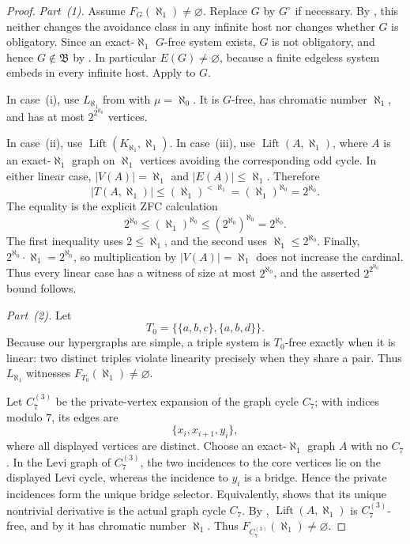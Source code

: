 \documentclass[11pt]{amsart}
\theoremstyle{definition}
\theoremstyle{remark}
\numberwithin{equation}{section}
\newcommand{\Bclass}{\mathfrak B}
\newcommand{\Lift}{\operatorname{Lift}}
\begin{document}
\begin{proof}
\emph{Part~\textup{(1)}.}
Assume $F_G(\aleph_1)\ne\varnothing$.  Replace $G$ by $G^\circ$ if
necessary.  By , this neither changes the
avoidance class in any infinite host nor changes whether $G$ is
obligatory.  Since an exact-$\aleph_1$ $G$-free system exists, $G$ is not
obligatory, and hence $G\notin\Bclass$ by .
In particular $E(G)\ne\varnothing$, because a finite edgeless system
embeds in every infinite host.  Apply
 to $G$.

In case~\textup{(i)}, use $L_{\aleph_1}$ from
 with $\mu=\aleph_0$.  It is $G$-free, has
chromatic number $\aleph_1$, and has at most
$2^{2^{\aleph_0}}$ vertices.

In case~\textup{(ii)}, use $\Lift(K_{\aleph_1},\aleph_1)$.  In
case~\textup{(iii)}, use $\Lift(A,\aleph_1)$, where $A$ is an
exact-$\aleph_1$ graph on $\aleph_1$ vertices avoiding the corresponding
odd cycle.  In either linear case, $|V(A)|=\aleph_1$ and
$|E(A)|\le\aleph_1$.  Therefore
\[
 |T(A,\aleph_1)|
 \le (\aleph_1)^{<\aleph_1}
 = (\aleph_1)^{\aleph_0}
 = 2^{\aleph_0}.
\]
The equality is the explicit ZFC calculation
\[
 2^{\aleph_0}
 \le (\aleph_1)^{\aleph_0}
 \le (2^{\aleph_0})^{\aleph_0}
 =2^{\aleph_0}.
\]
The first inequality uses $2\le\aleph_1$, and the second uses
$\aleph_1\le2^{\aleph_0}$.  Finally,
$2^{\aleph_0}\cdot\aleph_1=2^{\aleph_0}$, so multiplication by
$|V(A)|=\aleph_1$ does not increase the cardinal.  Thus every linear
case has a witness of size at most $2^{\aleph_0}$, and the asserted
$2^{2^{\aleph_0}}$ bound follows.

\emph{Part~\textup{(2)}.}
Let
\[
 T_0=\bigl\{\{a,b,c\},\{a,b,d\}\bigr\}.
\]
Because our hypergraphs are simple, a triple system is $T_0$-free
exactly when it is linear: two distinct triples violate linearity
precisely when they share a pair.
Thus $L_{\aleph_1}$ witnesses $F_{T_0}(\aleph_1)\ne\varnothing$.

Let $C_7^{(3)}$ be the private-vertex expansion of the graph cycle
$C_7$; with indices modulo $7$, its edges are
\[
 \{x_i,x_{i+1},y_i\},
\]
where all displayed vertices are distinct.  Choose an exact-$\aleph_1$
graph $A$ with no $C_7$.  In the Levi graph of $C_7^{(3)}$, the two incidences to the core
vertices lie on the displayed Levi cycle, whereas the incidence to
$y_i$ is a bridge.  Hence the private incidences form the unique bridge
selector.  Equivalently,  shows that its unique
nontrivial derivative is the actual graph cycle $C_7$.  By
, $\Lift(A,\aleph_1)$ is
$C_7^{(3)}$-free, and by  it has chromatic
number $\aleph_1$.  Thus $F_{C_7^{(3)}}(\aleph_1)\ne\varnothing$.


\end{proof}
\end{document}
